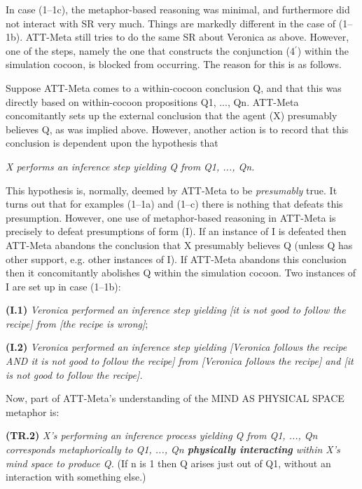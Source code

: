 In case (1--1c), the metaphor-based reasoning was minimal, and furthermore did
not interact with SR very much.  Things are markedly
different in the case of (1--1b).  ATT-Meta still tries to do the same
SR about Veronica as above. However, one of the steps, namely
the one that constructs the conjunction (4$^\prime$) within the simulation cocoon, is
blocked from occurring.  The reason for this is as follows.

Suppose ATT-Meta comes to a within-cocoon conclusion Q, and that this was
directly based on within-cocoon  propositions  Q1, ..., Qn.   ATT-Meta concomitantly
sets up the external conclusion that the agent (X) presumably believes Q, as was
implied above.  However, another action is to record that this conclusion is
dependent upon the hypothesis that

\hang{} {\it X performs an inference step yielding Q from  Q1, ..., Qn.}

\noindent
This hypothesis is, normally, deemed by ATT-Meta to be {\it presumably} true.
It turns out that for examples (1--1a) and (1--c) there is nothing that defeats
this presumption.  However, one use of metaphor-based reasoning in ATT-Meta is
precisely to defeat presumptions of form (I). If an instance of I is defeated
then ATT-Meta abandons the conclusion that X presumably believes Q (unless Q
has other support, e.g. other instances of I). If ATT-Meta abandons this
conclusion then it concomitantly abolishes Q within the simulation cocoon.  Two
instances of I are set up in case (1--1b):

\addtolength{\baselineskip}{-.375\baselineskip}

{\bf (I.1)} {\it Veronica performed an inference step yielding [it is
not  good to follow the recipe] from [the recipe is wrong]};

{\bf (I.2)} {\it Veronica performed an inference step yielding [Veronica
follows the recipe AND it is not  good to follow the recipe] from
[Veronica follows the recipe] and [it is not good to follow the recipe].}

Now, part of ATT-Meta's understanding of the MIND AS PHYSICAL SPACE metaphor is:

{\bf (TR.2)} {\it X's performing an inference process yielding Q from Q1, ..., Qn corresponds
metaphorically to Q1, ..., Qn {\bf physically interacting} within X's mind
space to produce Q.} (If n is 1 then Q arises just out of Q1, without an interaction
with something else.)  

\addtolength{\baselineskip}{+.6\baselineskip}

